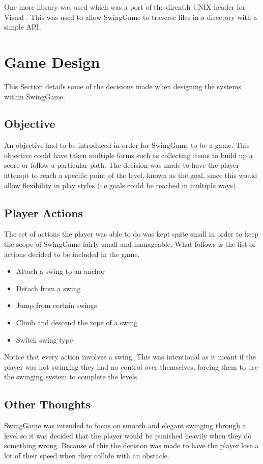 \documentclass[]{report}
\begin{document}
		One more library was used which was a port of the dirent.h UNIX header for Visual  \cite{dirent}. This was used to allow SwingGame to traverse files in a directory with a simple API.
		
	\section{Game Design}
	This Section details some of the decisions made when designing the systems within SwingGame.
	\subsection{Objective}
	An objective had to be introduced in order for SwingGame to be a game. This objective could have taken multiple forms such as collecting items to build up a score or follow a particular path. The decision was made to have the player attempt to reach a specific point of the level, known as the goal, since this would allow flexibility in play styles (i.e goals could be reached in multiple ways).
	\subsection{Player Actions}
	The set of actions the player was able to do was kept quite small in order to keep the scope of SwingGame fairly small and manageable. What follows is the list of actions decided to be included in the game.
	\begin{itemize}
		\item{Attach a swing to an anchor}
		\item{Detach from a swing}
		\item{Jump from certain swings}
		\item{Climb and descend the rope of a swing}
		\item{Switch swing type}
	\end{itemize}
	Notice that every action involves a swing. This was intentional as it meant if the player was not swinging they had no control over themselves, forcing them to use the swinging system to complete the levels.
	\subsection{Other Thoughts}
	SwingGame was intended to focus on smooth and elegant swinging through a level so it was decided that the player would be punished heavily when they do something wrong. Because of this the decision was made to have the player lose a lot of their speed when they collide with an obstacle.
	
\end{document}
